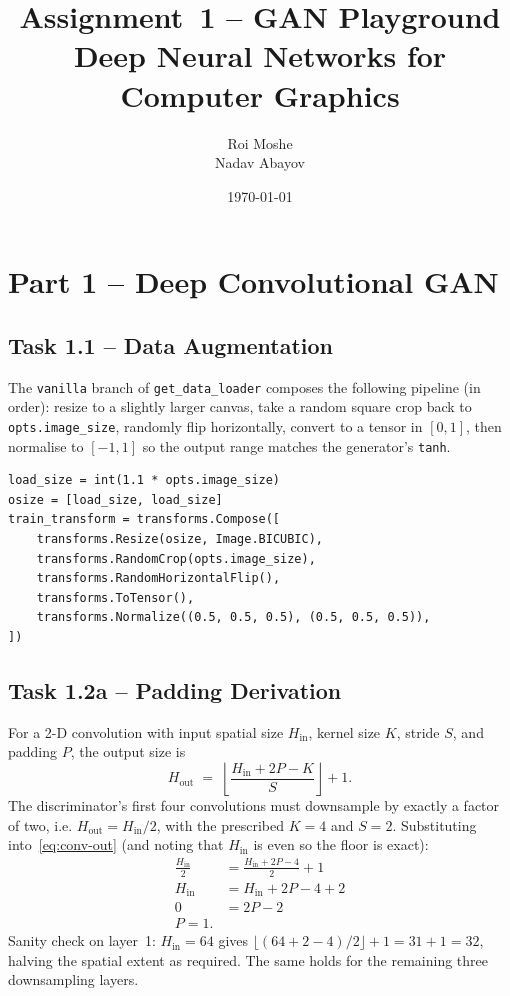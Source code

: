 \documentclass[11pt,a4paper]{article}
\title{Assignment~1 -- GAN Playground\\
       \large Deep Neural Networks for Computer Graphics}
\author{Roi Moshe \\ Nadav Abayov}
\date{\today}
\begin{document}
\maketitle

\section*{Part 1 -- Deep Convolutional GAN}

\subsection*{Task 1.1 -- Data Augmentation}

The \texttt{vanilla} branch of \texttt{get\_data\_loader} composes the
following pipeline (in order): resize to a slightly larger canvas, take a
random square crop back to \texttt{opts.image\_size}, randomly flip
horizontally, convert to a tensor in $[0,1]$, then normalise to $[-1,1]$
so the output range matches the generator's \texttt{tanh}.

\begin{lstlisting}
load_size = int(1.1 * opts.image_size)
osize = [load_size, load_size]
train_transform = transforms.Compose([
    transforms.Resize(osize, Image.BICUBIC),
    transforms.RandomCrop(opts.image_size),
    transforms.RandomHorizontalFlip(),
    transforms.ToTensor(),
    transforms.Normalize((0.5, 0.5, 0.5), (0.5, 0.5, 0.5)),
])
\end{lstlisting}

\subsection*{Task 1.2a -- Padding Derivation}

For a 2-D convolution with input spatial size $H_{\text{in}}$, kernel
size $K$, stride $S$, and padding $P$, the output size is
%
\begin{equation}
    H_{\text{out}}
    \;=\;
    \left\lfloor
    \frac{H_{\text{in}} + 2P - K}{S}
    \right\rfloor + 1.
    \label{eq:conv-out}
\end{equation}
%
The discriminator's first four convolutions must downsample by exactly a
factor of two, i.e. $H_{\text{out}} = H_{\text{in}}/2$, with the prescribed
$K = 4$ and $S = 2$. Substituting into~\eqref{eq:conv-out} (and noting
that $H_{\text{in}}$ is even so the floor is exact):
%
\begin{align*}
    \frac{H_{\text{in}}}{2}
        &= \frac{H_{\text{in}} + 2P - 4}{2} + 1 \\[2pt]
    H_{\text{in}}
        &= H_{\text{in}} + 2P - 4 + 2 \\[2pt]
    0   &= 2P - 2 \\[2pt]
    \boxed{P = 1.}
\end{align*}
%
Sanity check on layer~1: $H_{\text{in}}=64$ gives
$\lfloor (64 + 2 - 4)/2 \rfloor + 1 = 31 + 1 = 32$, halving the spatial
extent as required. The same holds for the remaining three downsampling
layers.
\end{document}
